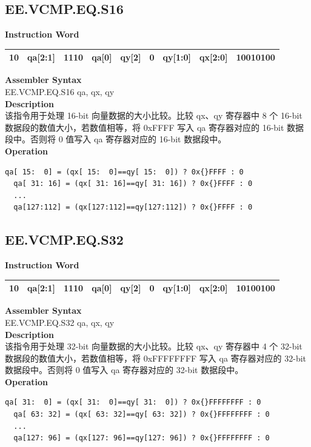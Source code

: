 \clearpage
\subsection{EE.VCMP.EQ.S16}\label{instruction:EEVCMPEQS16}
\setlength\tabcolsep{6pt}
\textbf{Instruction Word} \\
\begin{tabular}{|c|c|c|c|c|c|c|c|c|}
	\hline
	10 & qa[2:1] & 1110 & qa[0] & qy[2] & 0 & qy[1:0] & qx[2:0] & 10010100 \\
	\hline
\end{tabular}

\textbf{Assembler Syntax} \\
EE.VCMP.EQ.S16 qa, qx, qy \\
\textbf{Description} \\
该指令用于处理 16-bit 向量数据的大小比较。比较 qx、qy 寄存器中 8 个 16-bit 数据段的数值大小，若数值相等，将 0x{}FFFF 写入 qa 寄存器对应的 16-bit 数据段中。否则将 0 值写入 qa 寄存器对应的 16-bit 数据段中。\\
\textbf{Operation}
\begin{lstlisting}[escapeinside=`?]
  qa[ 15:  0] = (qx[ 15:  0]==qy[ 15:  0]) ? 0x{}FFFF : 0
  qa[ 31: 16] = (qx[ 31: 16]==qy[ 31: 16]) ? 0x{}FFFF : 0
  ...
  qa[127:112] = (qx[127:112]==qy[127:112]) ? 0x{}FFFF : 0
\end{lstlisting}

\clearpage
\subsection{EE.VCMP.EQ.S32}\label{instruction:EEVCMPEQS32}
\setlength\tabcolsep{6pt}
\textbf{Instruction Word} \\
\begin{tabular}{|c|c|c|c|c|c|c|c|c|}
	\hline
	10 & qa[2:1] & 1110 & qa[0] & qy[2] & 0 & qy[1:0] & qx[2:0] & 10100100 \\
	\hline
\end{tabular}

\textbf{Assembler Syntax} \\
EE.VCMP.EQ.S32 qa, qx, qy \\
\textbf{Description} \\
该指令用于处理 32-bit 向量数据的大小比较。比较 qx、qy 寄存器中 4 个 32-bit 数据段的数值大小，若数值相等，将 0x{}FFFFFFFF 写入 qa 寄存器对应的 32-bit 数据段中。否则将 0 值写入 qa 寄存器对应的 32-bit 数据段中。\\
\textbf{Operation}
\begin{lstlisting}[escapeinside=`?]
  qa[ 31:  0] = (qx[ 31:  0]==qy[ 31:  0]) ? 0x{}FFFFFFFF : 0
  qa[ 63: 32] = (qx[ 63: 32]==qy[ 63: 32]) ? 0x{}FFFFFFFF : 0
  ...
  qa[127: 96] = (qx[127: 96]==qy[127: 96]) ? 0x{}FFFFFFFF : 0
\end{lstlisting}

